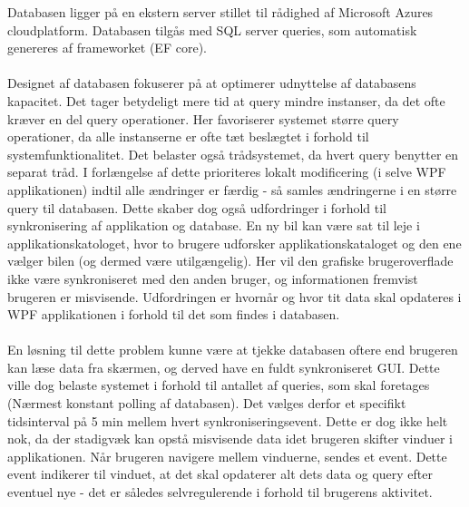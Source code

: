 \documentclass[Rapport/Rapport_main.tex]{subfiles}
\begin{document}
\noindent Databasen ligger på en ekstern server stillet til rådighed af Microsoft Azures cloudplatform. Databasen tilgås med SQL server queries, som automatisk genereres af frameworket (EF core). \\\\
Designet af databasen fokuserer på at optimerer udnyttelse af databasens kapacitet. Det tager betydeligt mere tid at query mindre instanser, da det ofte kræver en del query operationer. Her favoriserer systemet større query operationer, da alle instanserne er ofte tæt beslægtet i forhold til systemfunktionalitet. Det belaster også trådsystemet, da hvert query benytter en separat tråd. I forlængelse af dette prioriteres lokalt modificering (i selve WPF applikationen) indtil alle ændringer er færdig - så samles ændringerne i en større query til databasen. Dette skaber dog også udfordringer i forhold til synkronisering af applikation og database. En ny bil kan være sat til leje i applikationskatologet, hvor to brugere udforsker applikationskataloget og den ene vælger bilen (og dermed være utilgængelig). Her vil den grafiske brugeroverflade ikke være synkroniseret med den anden bruger, og informationen fremvist brugeren er misvisende. Udfordringen er hvornår og hvor tit data skal opdateres i WPF applikationen i forhold til det som findes i databasen. \\\\
En løsning til dette problem kunne være at tjekke databasen oftere end brugeren kan læse data fra skærmen, og derved have en fuldt synkroniseret GUI. Dette ville dog belaste systemet i forhold til antallet af queries, som skal foretages (Nærmest konstant polling af databasen). Det vælges derfor et specifikt tidsinterval på 5 min mellem hvert synkroniseringsevent. Dette er dog ikke helt nok, da der stadigvæk kan opstå misvisende data idet brugeren skifter vinduer i applikationen. Når brugeren navigere mellem vinduerne, sendes et event. Dette event indikerer til vinduet, at det skal opdaterer alt dets data og query efter eventuel nye - det er således selvregulerende i forhold til brugerens aktivitet. \\\\
\end{document}
